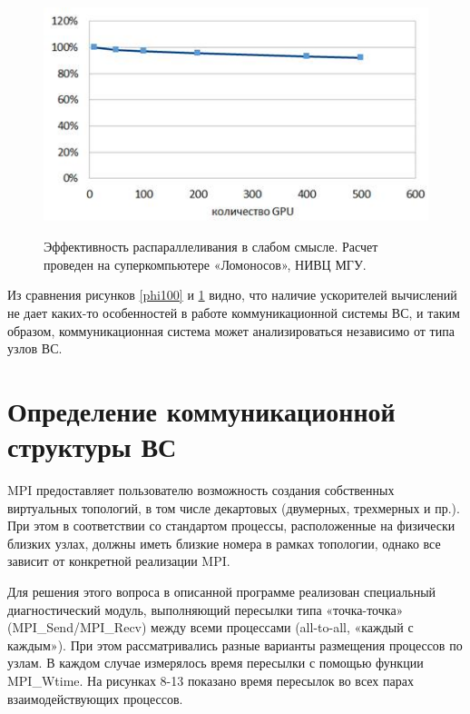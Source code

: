         \begin{figure}[htb]
        	\begin{center}
        		\includegraphics[height=7cm,keepaspectratio]{images/lomonosov_gpu500.jpg}
        	\end{center}
        	\caption{Эффективность распараллеливания в слабом смысле. Расчет проведен на суперкомпьютере «Ломоносов», НИВЦ МГУ.}
        	\label{gpu500}
        \end{figure}
        
        Из сравнения рисунков \ref{phi100} и \ref{gpu500} видно, что наличие ускорителей вычислений не дает каких-то особенностей в работе коммуникационной системы ВС, и таким образом, коммуникационная система может анализироваться независимо от типа узлов ВС.
          
        
        
        
        
        
        
        \section{Определение коммуникационной структуры ВС}
        
        MPI предоставляет пользователю возможность создания собственных виртуальных топологий, в том числе декартовых (двумерных, трехмерных  и пр.). При этом в соответствии со стандартом процессы, расположенные на физически близких узлах, должны иметь близкие номера в рамках топологии, однако все зависит от конкретной реализации MPI.  
        
        Для решения этого вопроса в описанной программе реализован специальный диагностический модуль, выполняющий пересылки типа «точка-точка» (MPI\_Send/MPI\_Recv) между всеми процессами (all-to-all, «каждый с каждым»). При этом рассматривались разные варианты размещения процессов по узлам. В каждом случае измерялось время пересылки с помощью функции MPI\_Wtime. На рисунках 8-13 показано время пересылок во всех парах взаимодействующих процессов.
        
